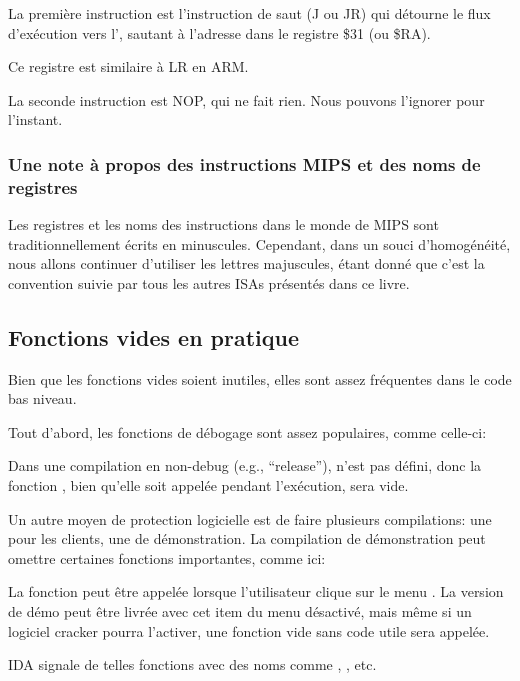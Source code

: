 

La première instruction est l'instruction de saut (J ou JR) qui détourne le flux
d'exécution vers l', sautant à l'adresse dans le registre
\$31 (ou \$RA).

Ce registre est similaire à \ac{LR} en ARM.

La seconde instruction est \ac{NOP}, qui ne fait rien.
Nous pouvons l'ignorer pour l'instant.

\subsubsection{Une note à propos des instructions MIPS et des noms de registres}

Les registres et les noms des instructions dans le monde de MIPS sont traditionnellement écrits en minuscules.
Cependant, dans un souci d'homogénéité, nous allons continuer d'utiliser les lettres majuscules,
étant donné que c'est la convention suivie par tous les autres \ac{ISA}s présentés dans ce livre.

\subsection{Fonctions vides en pratique}

Bien que les fonctions vides soient inutiles, elles sont assez fréquentes dans le code bas niveau.

Tout d'abord, les fonctions de débogage sont assez populaires, comme celle-ci:



Dans une compilation en non-debug (e.g., ``release''),  n'est pas défini,
donc la fonction , bien qu'elle soit appelée pendant l'exécution,
sera vide.

Un autre moyen de protection logicielle est de faire plusieurs compilations: une pour les clients, une de démonstration.
La compilation de démonstration peut omettre certaines fonctions importantes, comme ici:



La fonction  peut être appelée lorsque l'utilisateur clique sur le menu .
La version de démo peut être livrée avec cet item du menu désactivé, mais même si un logiciel cracker pourra l'activer,
une fonction vide sans code utile sera appelée.

IDA signale de telles fonctions avec des noms comme , , etc.

